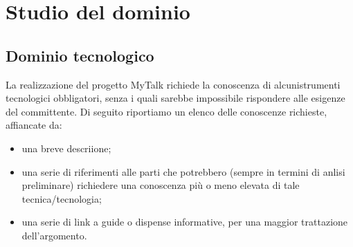 \section{Studio del dominio}

\subsection{Dominio tecnologico}
La realizzazione del progetto MyTalk richiede la conoscenza di alcunistrumenti tecnologici obbligatori, senza i quali sarebbe impossibile rispondere alle esigenze del committente. Di seguito riportiamo un elenco delle conoscenze richieste, affiancate da:

\begin{itemize}
	\item una breve descriione;
	\item una serie di riferimenti alle parti che potrebbero (sempre in termini di anlisi preliminare) richiedere una conoscenza più o meno elevata di tale tecnica/tecnologia;
	\item una serie di link a guide o dispense informative, per una maggior trattazione dell'argomento.
\end{itemize}

